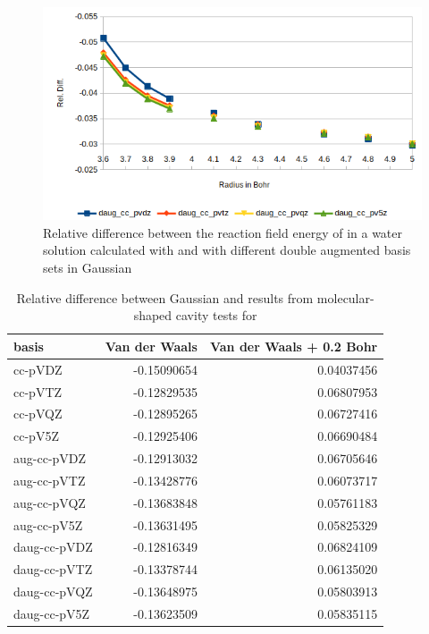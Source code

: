\documentclass[../master_thesis.tex]{subfiles}
\begin{document}
\begin{figure}[!htb]
  \centering
    \includegraphics[width=\linewidth]{img/cyandaugreldiff.png}
  \caption[Relative difference between  and double augmented Gaussian results]{Relative difference between the reaction field energy of  in a water solution calculated with \mrchem
  and with different double augmented basis sets in Gaussian}
  \label{fig:cyanreldiffdaug}
\end{figure}


\begin{table}[htbp]
\caption[Relative difference between Gaussian and \mrchem results for ]{Relative difference between Gaussian and \mrchem results from molecular-shaped cavity  tests for }
\begin{tabular}{l|r|r}
basis & \multicolumn{1}{l|}{Van der Waals} & \multicolumn{1}{l|}{Van der Waals + 0.2 Bohr} \\ \hline
cc-pVDZ & -0.15090654 & 0.04037456 \\
cc-pVTZ & -0.12829535 & 0.06807953 \\
cc-pVQZ & -0.12895265 & 0.06727416 \\
cc-pV5Z & -0.12925406 & 0.06690484 \\ \hline
aug-cc-pVDZ & -0.12913032 & 0.06705646 \\
aug-cc-pVTZ & -0.13428776 & 0.06073717 \\
aug-cc-pVQZ & -0.13683848 & 0.05761183 \\
aug-cc-pV5Z & -0.13631495 & 0.05825329 \\ \hline
daug-cc-pVDZ & -0.12816349 & 0.06824109 \\
daug-cc-pVTZ & -0.13378744 & 0.06135020 \\
daug-cc-pVQZ & -0.13648975 & 0.05803913 \\
daug-cc-pV5Z & -0.13623509 & 0.05835115 \\
\end{tabular}
\label{tab:watabcreldiff}
\end{table}
\end{document}
